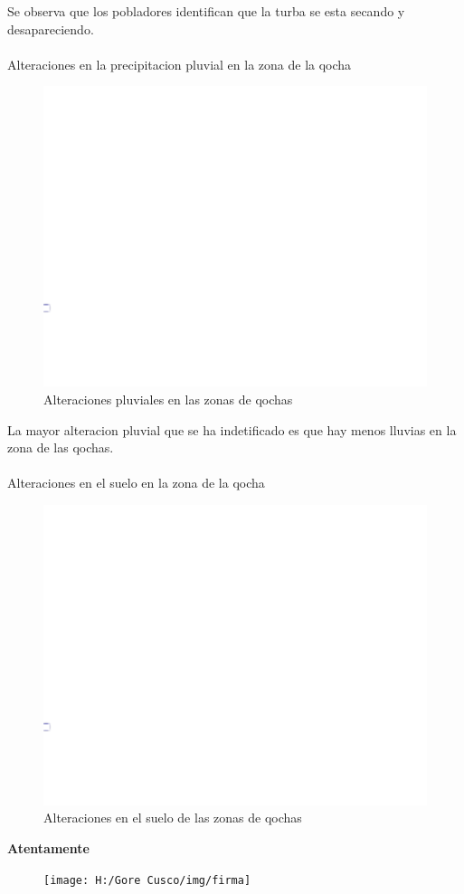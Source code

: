 \documentclass[12pt]{article}\usepackage[]{graphicx}\usepackage[]{xcolor}
\makeatletter
\def\maxwidth{ %
  \ifdim\Gin@nat@width>\linewidth
    \linewidth
  \else
    \Gin@nat@width
  \fi
}
\newenvironment{knitrout}{}{} %
\makeatother
\begin{document}
	Se observa que los pobladores identifican que la turba se esta secando y desapareciendo.\\
	\\
	Alteraciones en la precipitacion pluvial en la zona de la qocha
	\begin{figure}[H]
	\centering
\begin{knitrout}
\color{fgcolor}
\includegraphics[width=\maxwidth]{figure/treintaycinco-1} 
\end{knitrout}
	\caption{Alteraciones pluviales en las zonas de qochas}
	\end{figure}
	La mayor alteracion pluvial que se ha indetificado es que hay menos lluvias en la zona de las qochas. \\
	\\
	Alteraciones en el suelo en la zona de la qocha
		\begin{figure}[H]
	\centering
\begin{knitrout}
\color{fgcolor}
\includegraphics[width=\maxwidth]{figure/treintayseis-1} 
\end{knitrout}
	\caption{Alteraciones en el suelo de las zonas de qochas}
	\end{figure}
	
	\begin{center}
		\textbf{Atentamente}
	\end{center}
	
	
	\begin{figure}[H]
		\centering
		\texttt{[image: H:/Gore Cusco/img/firma]}
	\end{figure}
	\thispagestyle{lastpage}
\end{document}
